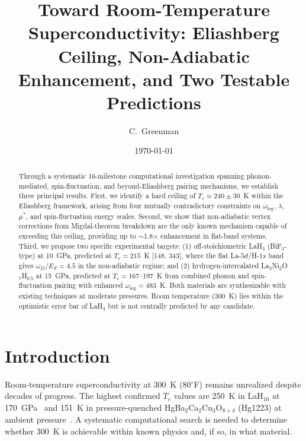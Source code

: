 \documentclass[aps,prb,reprint,superscriptaddress,longbibliography]{revtex4-2}
\begin{document}
\title{Toward Room-Temperature Superconductivity: Eliashberg Ceiling, Non-Adiabatic Enhancement, and Two Testable Predictions}

\author{C.~Greenman}

\date{\today}

\begin{abstract}
Through a systematic 16-milestone computational investigation spanning phonon-mediated, spin-fluctuation, and beyond-Eliashberg pairing mechanisms, we establish three principal results. First, we identify a hard ceiling of $T_c \approx 240 \pm 30$~K within the Eliashberg framework, arising from four mutually contradictory constraints on $\omega_{\log}$, $\lambda$, $\mu^*$, and spin-fluctuation energy scales. Second, we show that non-adiabatic vertex corrections from Migdal-theorem breakdown are the only known mechanism capable of exceeding this ceiling, providing up to $\sim$1.8$\times$ enhancement in flat-band systems. Third, we propose two specific experimental targets: (1) off-stoichiometric LaH$_3$ (BiF$_3$-type) at 10~GPa, predicted at $T_c = 215$~K [148, 343], where the flat La-$5d$/H-$1s$ band gives $\omega_D/E_F = 4.5$ in the non-adiabatic regime; and (2) hydrogen-intercalated La$_3$Ni$_2$O$_7$H$_{0.5}$ at 15~GPa, predicted at $T_c = 167$--197~K from combined phonon and spin-fluctuation pairing with enhanced $\omega_{\log} = 483$~K. Both materials are synthesizable with existing techniques at moderate pressures. Room temperature (300~K) lies within the optimistic error bar of LaH$_3$ but is not centrally predicted by any candidate.
\end{abstract}

\maketitle

\section{Introduction}
\label{sec:intro}

Room-temperature superconductivity at 300~K (80$^\circ$F) remains unrealized despite decades of progress. The highest confirmed $T_c$ values are 250~K in LaH$_{10}$ at 170~GPa~\cite{Somayazulu2019} and 151~K in pressure-quenched HgBa$_2$Ca$_2$Cu$_3$O$_{8+\delta}$ (Hg1223) at ambient pressure~\cite{Deng2026}. A systematic computational search is needed to determine whether 300~K is achievable within known physics and, if so, in what material.
\end{document}
